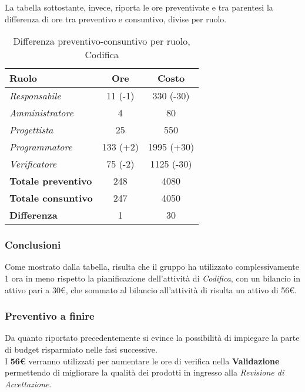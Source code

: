 La tabella sottostante, invece, riporta le ore preventivate e  tra parentesi la differenza di ore tra preventivo e consuntivo, divise per ruolo.

\begin{table}[H]
	\begin{center}
		\begin{tabular}{|l|c|c|}
			\hline
			\textbf{Ruolo}	& \textbf{Ore} & \textbf{Costo} 		\\
			\hline
			\textit{Responsabile}		&	11 (-1)	&	330 (-30)	\\
			\hline
			\textit{Amministratore}		&	4		&	80			\\
			\hline
			\textit{Progettista}		&	25		&	550			\\
			\hline
			\textit{Programmatore}		&	133	(+2)&	1995 (+30)	\\
			\hline
			\textit{Verificatore}		&	75	(-2)&	1125 (-30)	\\
			\hline
			\textbf{Totale preventivo}	&	248		& 	4080		\\
			\hline
			\textbf{Totale consuntivo}	&	247		&  	4050		\\
			\hline
			\textbf{Differenza} 		&	1		&	30			\\
			\hline
		\end{tabular}
	\end{center}
	\caption{Differenza preventivo-consuntivo per ruolo, Codifica}
\end{table}

\subsubsection{Conclusioni}
Come mostrato dalla tabella, risulta che il gruppo ha utilizzato complessivamente 1 ora in meno rispetto la pianificazione dell'attività di \textit{Codifica}, con un bilancio in attivo pari a 30€, che sommato al bilancio all'attività di \textit{\PD} risulta un attivo di 56€.

\subsubsection{Preventivo a finire}
Da quanto riportato precedentemente si evince la possibilità di impiegare la parte di budget risparmiato nelle fasi successive. \\
I \textbf{56€} verranno utilizzati per aumentare le ore di verifica nella \textbf{Validazione} permettendo di migliorare la qualità dei prodotti in ingresso alla \textit{Revisione di Accettazione}.
